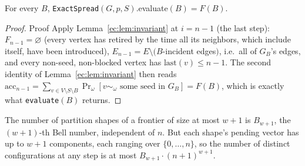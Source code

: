 \documentclass[ijoc,sglanonrev]{informs4}
\newcommand{\FF}{F}
\begin{document}
\begin{repeattheorem}
For every $B$, \texttt{ExactSpread}$(G,p,S)$.evaluate$(B)=\FF(B)$.
\end{repeattheorem}
\begin{proof}{Proof}
Apply Lemma~\ref{ec:lem:invariant} at $i=n-1$ (the last step): $F_{n-1}
=\varnothing$ (every vertex has retired by the time all its neighbors,
which include itself, have been introduced), $E_{n-1}=E\setminus(B$-incident
edges$)$, i.e.\ all of $G_B$'s edges, and every non-seed, non-blocked
vertex has $\mathrm{last}(v)\le n-1$. The second identity of
Lemma~\ref{ec:lem:invariant} then reads $\mathrm{acc}_{n-1}=
\sum_{v\in V\setminus S\setminus B}\Pr_\omega[v\sim_\omega\text{ some seed
in }G_B]=\FF(B)$, which is exactly what \texttt{evaluate}$(B)$
returns.\Halmos
\end{proof}

\begin{repeatproposition}
The number of partition shapes of a frontier of size at most $w+1$ is
$B_{w+1}$, the $(w+1)$-th Bell number, independent of $n$. But each shape's
pending vector has up to $w+1$ components, each ranging over
$\{0,\dots,n\}$, so the number of distinct configurations at any step is at
most $B_{w+1}\cdot(n+1)^{w+1}$.
\end{repeatproposition}
\end{document}
